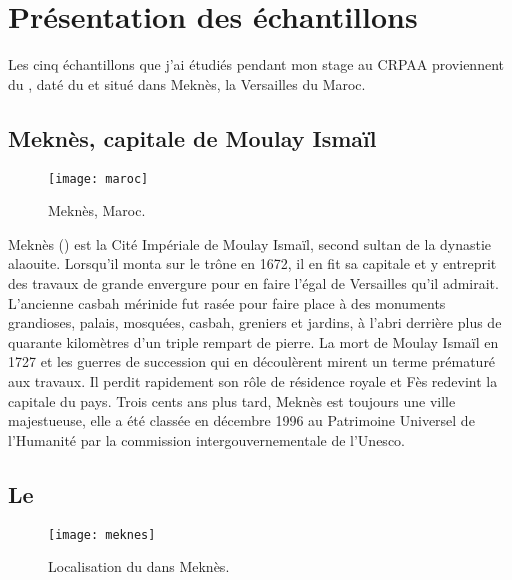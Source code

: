 
\chapter{Présentation des échantillons}

Les cinq échantillons que j'ai étudiés pendant mon stage au CRPAA 
proviennent du \PaM, daté du  et situé dans Meknès, la 
Versailles du Maroc.

\section{Meknès, capitale de Moulay Ismaïl}

\begin{figure}[hbt]
  \texttt{[image: maroc]}
  \caption{Meknès, Maroc.}
  \label{fig:maroc}
\end{figure}

Meknès () est la Cité Impériale de Moulay Ismaïl, 
second sultan de la dynastie alaouite. Lorsqu'il monta sur le trône 
en 1672, il en fit sa capitale et y entreprit des travaux de grande 
envergure pour en faire l'égal de Versailles qu'il admirait. 
L'ancienne casbah mérinide fut rasée pour faire place à des monuments 
grandioses, palais, mosquées, casbah, greniers et jardins, à l'abri 
derrière plus de quarante kilomètres d'un triple rempart de pierre. 
La mort de Moulay Ismaïl en 1727 et les guerres de succession qui 
en découlèrent mirent un terme prématuré aux travaux. Il perdit 
rapidement son rôle de résidence royale et Fès redevint la capitale 
du pays. Trois cents ans plus tard, Meknès est toujours une ville 
majestueuse, elle a été classée en décembre 1996 au Patrimoine 
Universel de l'Humanité par la commission intergouvernementale de 
l'Unesco.

\section{Le \PaM}

\begin{figure}[htb]
  \texttt{[image: meknes]}
  \caption{Localisation du \PaM dans Meknès.}
  \label{fig:meknes}
\end{figure}

